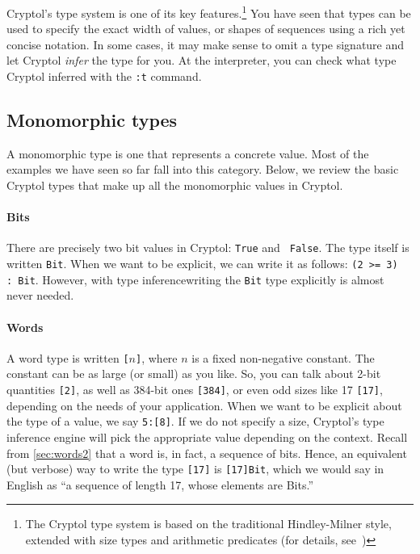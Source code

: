 Cryptol's type system is one of its key features.\footnote{The Cryptol
  type system is based on the traditional Hindley-Milner style,
  extended with size types and arithmetic
  predicates (for details, see~\cite{erkok-carlsson-wick-cryptolCoverification-09,
    erkok-matthews-cryptolEqChecking-09, Hin97})}  You have seen that
types can be used to specify the exact width of values, or shapes of
sequences using a rich yet concise notation.  In some cases, it may
make sense to omit a type signature and let Cryptol {\em infer} the
type for you. At the interpreter, you can check what type Cryptol
inferred with the \texttt{:t} command.


\subsection{Monomorphic types}\indMonomorphism
\label{sec:monomorphic-types}

A monomorphic type is one that represents a concrete value. Most of
the examples we have seen so far fall into this category. Below, we
review the basic Cryptol types that make up all the monomorphic values
in Cryptol.

\paragraph*{Bits}\indTheBitType\indTrue\indFalse There are precisely
two bit values in Cryptol: {\tt True} and {\tt
  False}. The type itself is written {\tt Bit}. When we want to be
explicit, we can write it as follows: \texttt{(2 >= 3) :\ Bit}. However,
with type inference\indTypeInference writing the {\tt Bit} type
explicitly is almost never needed.

\paragraph*{Words}\indTheWordType\indTheBitType A word type is written
{\tt [}$n${\tt ]}, where $n$ is a fixed
non-negative constant. The constant can be as large (or small) as you
like.  So, you can talk about 2-bit quantities {\tt [2]}, as well as
384-bit ones {\tt [384]}, or even odd sizes like 17 {\tt [17]},
depending on the needs of your application. When we want to be
explicit about the type of a value, we say {\tt 5:[8]}. If we do not
specify a size, Cryptol's type inference engine will pick the
appropriate value depending on the context.\indTypeInference
Recall from \autoref{sec:words2} that a word is, in fact, a
sequence of bits.  Hence, an equivalent (but verbose) way to write the
type {\tt [17]} is {\tt [17]Bit}, which we would say in English as
``a sequence of length 17, whose elements are Bits.''

